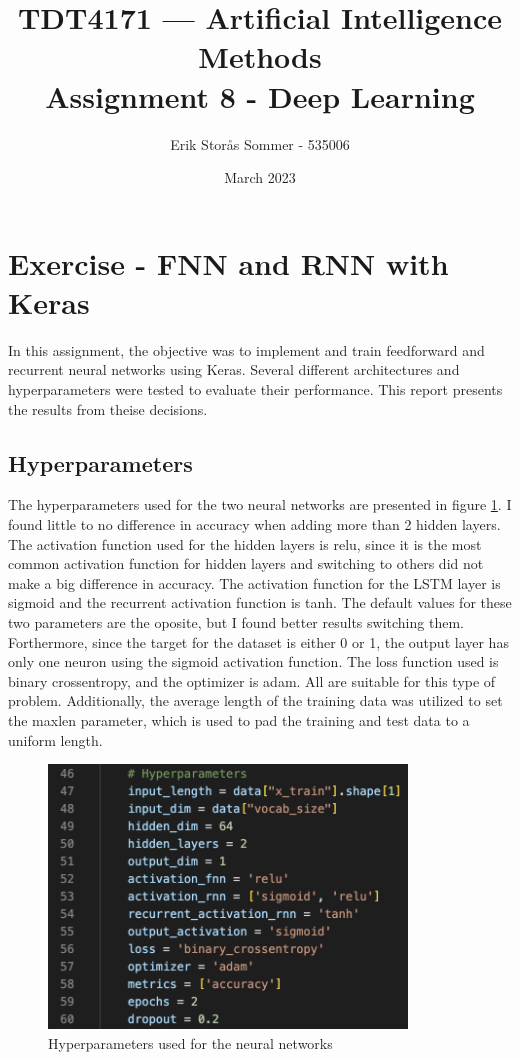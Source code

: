 \documentclass{article}
\title{TDT4171 — Artificial Intelligence Methods \\ Assignment 8 - Deep Learning}
\author{Erik Storås Sommer - 535006}
\date{March 2023}
\begin{document}
\maketitle
\setlength{\parindent}{0pt}

\section*{Exercise - FNN and RNN with Keras}

In this assignment, the objective was to implement and train feedforward and recurrent neural networks using Keras.
Several different architectures and hyperparameters were tested to evaluate their performance.
This report presents the results from theise decisions.

\subsection*{Hyperparameters}

The hyperparameters used for the two neural networks are presented in figure \ref{fig:image1}. I found little to no difference in accuracy when adding more than 2 hidden layers.
The activation function used for the hidden layers is relu, since it is the most common activation function for hidden layers and switching to others did not make a big difference in accuracy.
The activation function for the LSTM layer is sigmoid and the recurrent activation function is tanh.
The default values for these two parameters are the oposite, but I found better results switching them.
Forthermore, since the target for the dataset is either 0 or 1, the output layer has only one neuron using the sigmoid activation function.
The loss function used is binary crossentropy, and the optimizer is adam.
All are suitable for this type of problem.
Additionally, the average length of the training data was utilized to set the maxlen parameter, which is used to pad the training and test data to a uniform length.

\begin{figure}[hbtp]
    \centering
    \includegraphics[width=0.85\textwidth]{images/hyperparameters.png}
    \caption{Hyperparameters used for the neural networks}
    \label{fig:image1}
\end{figure}
\end{document}
